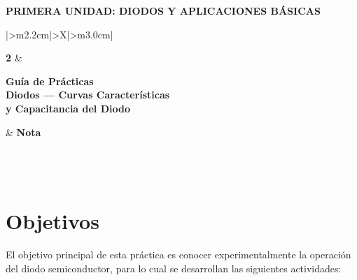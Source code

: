 \documentclass[11pt,a4paper]{article}
\begin{document}
\begin{center}
    {\normalsize\bfseries PRIMERA UNIDAD: DIODOS Y APLICACIONES BÁSICAS}
\end{center}

\vspace{0.55cm}

\begingroup
\renewcommand{\tabularxcolumn}[1]{m{#1}}
\renewcommand{\arraystretch}{2.0}
\setlength{\tabcolsep}{12pt}
\noindent
\begin{tabularx}{\textwidth}{|>{\centering\arraybackslash}m{2.2cm}|>{\centering\arraybackslash}X|>{\centering\arraybackslash}m{3.0cm}|}
\hline
\rule{0pt}{2.1cm}{\fontsize{58}{58}\selectfont\bfseries 2}
    & \begin{minipage}[c]{\linewidth}\centering
          {\large\bfseries Guía de Prácticas}\\[7pt]
          {\Large\bfseries Diodos --- Curvas Características\\ y Capacitancia del Diodo}
      \end{minipage}
    & {\Large\bfseries Nota}\\
\hline
{}\\
\hline
{}\\
\\
\hline
\end{tabularx}
\endgroup

\vspace{1.2cm}

\section{Objetivos}
El objetivo principal de esta práctica es conocer experimentalmente la operación del diodo
semiconductor, para lo cual se desarrollan las siguientes actividades:
\end{document}
